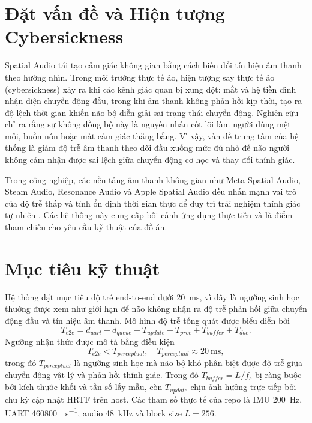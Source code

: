 \section{Đặt vấn đề và Hiện tượng Cybersickness}
Spatial Audio tái tạo cảm giác không gian bằng cách biến đổi tín hiệu âm thanh theo hướng nhìn. Trong môi trường thực tế ảo, hiện tượng say thực tế ảo (cybersickness) xảy ra khi các kênh giác quan bị xung đột: mắt và hệ tiền đình nhận diện chuyển động đầu, trong khi âm thanh không phản hồi kịp thời, tạo ra độ lệch thời gian khiến não bộ diễn giải sai trạng thái chuyển động. Nghiên cứu \cite{cybersickness2000} chỉ ra rằng sự không đồng bộ này là nguyên nhân cốt lõi làm người dùng mệt mỏi, buồn nôn hoặc mất cảm giác thăng bằng. Vì vậy, vấn đề trung tâm của hệ thống là giảm độ trễ âm thanh theo dõi đầu xuống mức đủ nhỏ để não người không cảm nhận được sai lệch giữa chuyển động cơ học và thay đổi thính giác.

Trong công nghiệp, các nền tảng âm thanh không gian như Meta Spatial Audio, Steam Audio, Resonance Audio và Apple Spatial Audio đều nhấn mạnh vai trò của độ trễ thấp và tính ổn định thời gian thực để duy trì trải nghiệm thính giác tự nhiên \cite{meta_spatial_audio,steam_audio,resonance_audio,apple_spatial_audio}. Các hệ thống này cung cấp bối cảnh ứng dụng thực tiễn và là điểm tham chiếu cho yêu cầu kỹ thuật của đồ án.

\section{Mục tiêu kỹ thuật}
Hệ thống đặt mục tiêu độ trễ end-to-end dưới \SI{20}{\milli\second}, vì đây là ngưỡng sinh học thường được xem như giới hạn để não không nhận ra độ trễ phản hồi giữa chuyển động đầu và tín hiệu âm thanh. Mô hình độ trễ tổng quát được biểu diễn bởi
\begin{equation}
    T_{e2e} = d_{uart} + d_{queue} + T_{update} + T_{proc} + T_{buffer} + T_{dac}.
\end{equation}
Ngưỡng nhận thức được mô tả bằng điều kiện
\begin{equation}
    T_{e2e} < T_{perceptual}, \quad T_{perceptual} \approx \SI{20}{\milli\second},
\end{equation}
trong đó $T_{perceptual}$ là ngưỡng sinh học mà não bộ khó phân biệt được độ trễ giữa chuyển động vật lý và phản hồi thính giác.
Trong đó $T_{buffer} = L / f_s$ bị ràng buộc bởi kích thước khối và tần số lấy mẫu, còn $T_{update}$ chịu ảnh hưởng trực tiếp bởi chu kỳ cập nhật HRTF trên host. Các tham số thực tế của repo là IMU \SI{200}{\hertz}, UART \SI{460800}{\bit\per\second}, audio \SI{48}{\kilo\hertz} và block size $L=256$.

